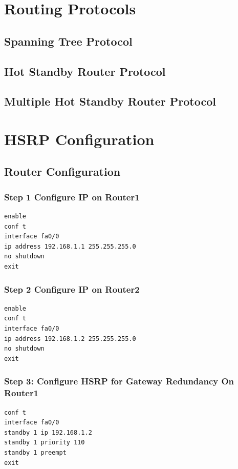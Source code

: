 \documentclass[12pt]{report}
\begin{document}
\chapter{Routing Protocols}
\section{Spanning Tree Protocol}
\section{Hot Standby Router Protocol}
\section{Multiple Hot Standby Router Protocol}
\newpage

\chapter{HSRP Configuration}

\section{Router Configuration}
\subsection*{Step 1 Configure IP on Router1}
\begin{Verbatim}[fontsize=\small, formatcom=\hackfont\color{black}, frame=single]
enable
conf t
interface fa0/0
ip address 192.168.1.1 255.255.255.0
no shutdown
exit
\end{Verbatim}

\subsection*{Step 2 Configure IP on Router2}
\begin{Verbatim}[fontsize=\small, formatcom=\hackfont\color{black}, frame=single]
enable
conf t
interface fa0/0
ip address 192.168.1.2 255.255.255.0
no shutdown
exit
\end{Verbatim}

\subsection*{Step 3: Configure HSRP for Gateway Redundancy On Router1}
\begin{Verbatim}[fontsize=\small, formatcom=\hackfont\color{black}, frame=single]
conf t
interface fa0/0
standby 1 ip 192.168.1.2
standby 1 priority 110
standby 1 preempt
exit
\end{Verbatim}
\end{document}
